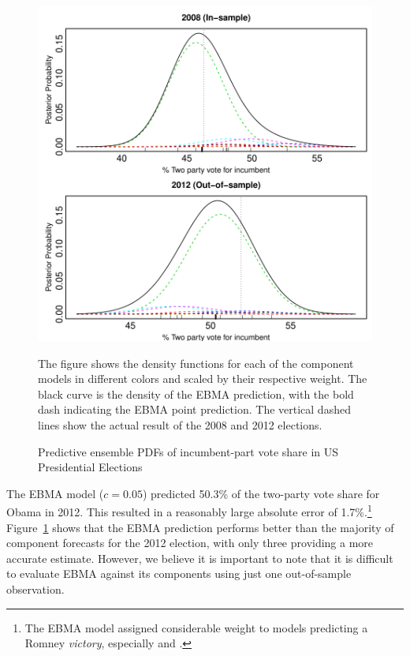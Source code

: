 \documentclass[12pt,fullpage,endnotes]{article}
\begin{document}
\begin{figure}[ht]
\caption{Predictive ensemble PDFs of incumbent-part vote share in US Presidential Elections}
\label{pres}
\begin{center}
\includegraphics[scale=.8]{presForecast}
\end{center}
The figure shows the density functions for each of the component
models in different colors and scaled by their respective weight. The black curve is the density of the EBMA
prediction, with the bold dash indicating the EBMA point
prediction. The vertical dashed lines show the actual result of the 2008 and 2012 elections.
\end{figure}


The EBMA model ($c=0.05$) predicted 50.3\% of the two-party vote share
for Obama in 2012.  This resulted in a reasonably large absolute error of
1.7\%.\footnote{The EBMA model assigned considerable weight to models
  predicting a Romney \textit{victory}, especially \citet{Hibbs:2012a}
  and \citet{LewisBeckTien:2012}.}  Figure~\ref{pres} shows that the
EBMA prediction performs better than the majority of component
forecasts for the 2012 election, with only three providing a more
accurate estimate. However, we believe it is important to note that
it is difficult to evaluate EBMA against its components using
just one out-of-sample observation.
\end{document}
